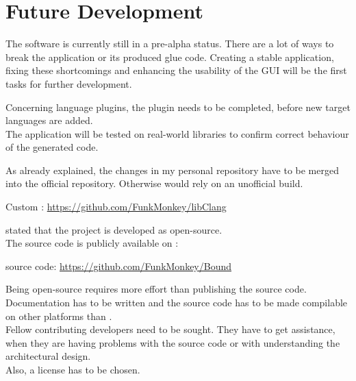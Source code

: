 \chapter{Future Development}
\label{chap:FutureDevelopment}

The software is currently still in a pre-alpha status. There are a lot of ways to break the application or its produced glue code. Creating a stable application, fixing these shortcomings and enhancing the usability of the GUI will be the first tasks for further development.

Concerning language plugins, the  plugin needs to be completed, before new target languages are added.\\
The application will be tested on real-world libraries to confirm correct behaviour of the generated code.

As already explained, the changes in my personal  repository have to be merged into the official repository. Otherwise  would rely on an unofficial  build.

\hspace{20pt} Custom : \url{https://github.com/FunkMonkey/libClang}

 stated that the project is developed as open-source.\\
The source code is publicly available on :

\hspace{20pt}  source code: \url{https://github.com/FunkMonkey/Bound}

Being open-source requires more effort than publishing the source code. Documentation has to be written and the source code has to be made compilable on other platforms than .\\
Fellow contributing developers need to be sought. They have to get assistance, when they are having problems with the source code or with understanding the architectural design.\\
Also, a license has to be chosen.

